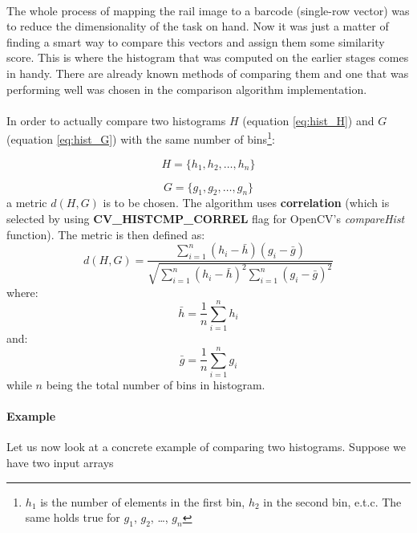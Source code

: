\paragraph{}
The whole process of mapping the rail image to a barcode (single-row vector) was to reduce the dimensionality of the task on hand. Now it was just a matter of finding a smart way to compare this vectors and assign them some similarity score. This is where the histogram that was computed on the earlier stages comes in handy. There are already known methods of comparing them and one that was performing well was chosen in the comparison algorithm implementation.

\paragraph{}
In order to actually compare two histograms $H$ (equation \ref{eq:hist_H}) and $G$ (equation \ref{eq:hist_G}) with the same number of bins\footnote{$h_1$ is the number of elements in the first bin, $h_2$ in the second bin, e.t.c. The same holds true for $g_1$, $g_2$, \dots, $g_n$}:

\begin{equation}
	H = \{h_1, h_2, \dots, h_n\}
	\label{eq:hist_H}
\end{equation}

\begin{equation}
	G = \{g_1, g_2, \dots, g_n\}
	\label{eq:hist_G}
\end{equation}
a metric $d(H, G)$ is to be chosen. The algorithm uses \textbf{correlation} (which is selected by using \textbf{CV\_HISTCMP\_CORREL} flag for OpenCV's \textit{compareHist} function). The metric is then defined as:
\begin{equation}
	d(H, G) = \frac{\sum_{i=1}^{n}(h_i - \bar{h})(g_i - \bar{g})}{\sqrt{\sum_{i=1}^{n}(h_i - \bar{h})^2 \sum_{i=1}^{n}(g_i - \bar{g})^2}}
	\label{eq:hist_comparison}
\end{equation}
where:
\begin{equation}
	\bar{h} = \frac{1}{n} \sum_{i=1}^{n} h_i
\end{equation}
and:
\begin{equation}
	\bar{g} = \frac{1}{n} \sum_{i=1}^{n} g_i
\end{equation}
while $n$ being the total number of bins in histogram.

\paragraph{Example}
Let us now look at a concrete example of comparing two histograms. Suppose we have two input arrays




